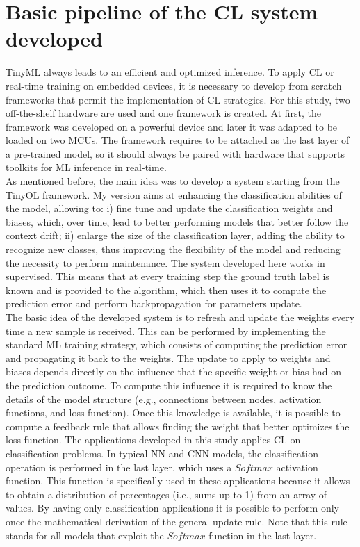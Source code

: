 \documentclass[12pt]{report}
\begin{document}
\section{Basic pipeline of the CL system developed}
\label{basic_system}
TinyML always leads to an efficient and optimized inference. To apply CL or real-time training on embedded devices, it is necessary to develop from scratch frameworks that permit the implementation of CL strategies. For this study, two off-the-shelf hardware are used and one framework is created. At first, the framework was developed on a powerful device and later it was adapted to be loaded on two MCUs. The framework requires to be attached as the last layer of a pre-trained model, so it should always be paired with hardware that supports toolkits for ML inference in real-time.\\
As mentioned before, the main idea was to develop a system starting from the TinyOL framework. My version aims at enhancing the classification abilities of the model, allowing to: i) fine tune and update the classification weights and biases, which, over time, lead to better performing models that better follow the context drift; ii) enlarge the size of the classification layer, adding the ability to recognize new classes, thus improving the flexibility of the model and reducing the necessity to perform maintenance. The system developed here works in supervised. This means that at every training step the ground truth label is known and is provided to the algorithm, which then uses it to compute the prediction error and perform backpropagation for parameters update.\\
The basic idea of the developed system is to refresh and update the weights every time a new sample is received. This can be performed by implementing the standard ML training strategy, which consists of computing the prediction error and propagating it back to the weights. The update to apply to weights and biases depends directly on the influence that the specific weight or bias had on the prediction outcome. To compute this influence it is required to know the details of the model structure (e.g., connections between nodes, activation functions, and loss function). Once this knowledge is available, it is possible to compute a feedback rule that allows finding the weight that better optimizes the loss function.
The applications developed in this study applies CL on classification problems. In typical NN and CNN models, the classification operation is performed in the last layer, which uses a $Softmax$ activation function. This function is specifically used in these applications because it allows to obtain a distribution of percentages (i.e., sums up to 1) from an array of values. By having only classification applications it is possible to perform only once the mathematical derivation of the general update rule. Note that this rule stands for all models that exploit the $Softmax$ function in the last layer.\\
\end{document}

